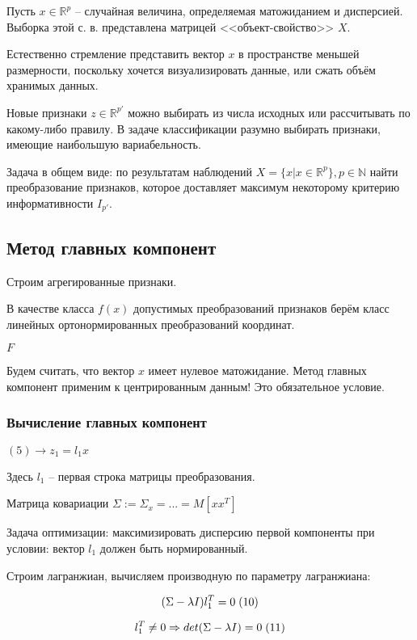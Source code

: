 \documentclass[main.tex]{subfiles}
\begin{document}
Пусть $ x \in \mathds{R}^p $ -- случайная величина, определяемая матожиданием и дисперсией.
Выборка этой с. в. представлена матрицей <<объект-свойство>> $ X $.

Естественно стремление представить вектор $ x $ в пространстве меньшей размерности, поскольку хочется визуализировать данные, или сжать объём хранимых данных.

Новые признаки $ z \in \mathds{R}^{p'} $ можно выбирать из числа исходных или рассчитывать по какому-либо правилу.
В задаче классификации разумно выбирать признаки, имеющие наибольшую вариабельность.

Задача в общем виде: по результатам наблюдений $ X = \{x | x \in \mathds{R}^p\}, p \in \mathds{N} $ найти преобразование признаков, которое доставляет максимум некоторому критерию информативности $I_{p'}$.

\subsection{Метод главных компонент}

Строим агрегированные признаки.

В качестве класса $f(x)$ допустимых преобразований признаков берём класс линейных ортонормированных преобразований координат.

$ F $


Будем считать, что вектор $x$ имеет нулевое матожидание.
Метод главных компонент применим к центрированным данным!
Это обязательное условие.

\subsubsection{Вычисление главных компонент}

$ (5) \to z_1 = l_1 x $

Здесь $ l_1 $ -- первая строка матрицы преобразования.

Матрица ковариации $ \Sigma := \Sigma_x = ... = M[xx^T] $

Задача оптимизации: максимизировать дисперсию первой компоненты при условии: вектор $l_1$ должен быть нормированный.

Строим лагранжиан, вычисляем производную по параметру лагранжиана:

$$ (\Sigma - \lambda I) l_1^T = 0 \thickspace (10) $$ %

$$ l_1^T \ne 0 \Rightarrow det(\Sigma - \lambda I) = 0 \thickspace (11) $$
\end{document}
